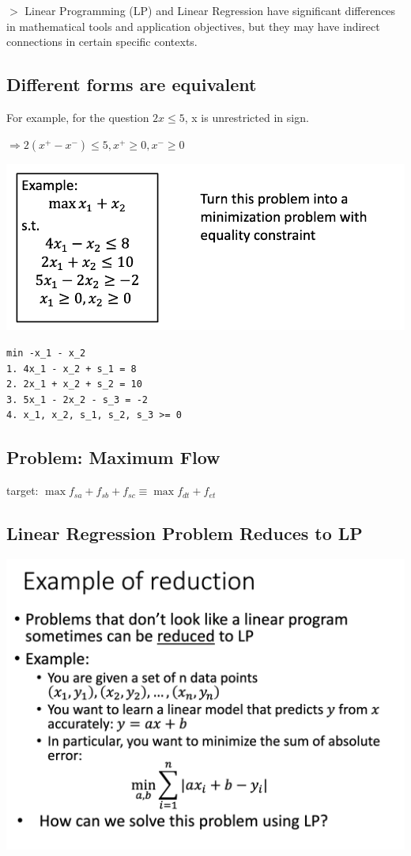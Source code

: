 \documentclass[12pt,a4paper]{article}
\newcommand{\remark}[1]{
    {\small $>$ {\color{blue} #1}}
}
\begin{document}
\remark{Linear Programming (LP) and Linear Regression have significant differences in mathematical tools and application objectives, but they may have indirect connections in certain specific contexts.}

\subsection*{Different forms are equivalent}

For example, for the question \(2x \leq 5\), x is unrestricted in sign.

$\Rightarrow 2(x^+ - x^-) \leq 5, x^+ \geq 0,x^- \geq 0$

\includegraphics[width=\textwidth]{./images/lp_turn.png}

\begin{verbatim}
min -x_1 - x_2
1. 4x_1 - x_2 + s_1 = 8
2. 2x_1 + x_2 + s_2 = 10
3. 5x_1 - 2x_2 - s_3 = -2
4. x_1, x_2, s_1, s_2, s_3 >= 0
\end{verbatim}

\subsection*{Problem: Maximum Flow}

target: \(\max{f_{sa} + f_{sb} +f_{sc}} \equiv \max{f_{dt} + f_{et}}\)

\subsection*{Linear Regression Problem Reduces to LP}

\includegraphics[width=\textwidth]{./images/lr_to_lp.png}
\end{document}
